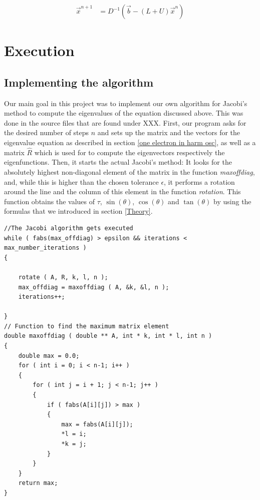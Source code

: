 \documentclass[10pt,a4paper]{article}
\begin{document}
\begin{align}
	\vec{x}^{n+1} &= D^{-1} \left( \vec{b}- (L+U) \vec{x}^{n} \right) 
\end{align}
\section{Execution}
\subsection{Implementing the algorithm}
Our main goal in this project was to implement our own algorithm for Jacobi's method to compute the eigenvalues of the equation discussed above. This was done in the source files that are found under XXX. First, our program asks for the desired number of steps $n$ and sets up the matrix and the vectors for the eigenvalue equation as described in section \ref{one electron in harm osc}, as well as a matrix $\hat{R}$ which is used for to compute the eigenvectors respectively the eigenfunctions. Then, it starts the actual Jacobi's method: It looks for the absolutely highest non-diagonal element of the matrix in the function \emph{maxoffdiag}, and, while this is higher than the chosen tolerance $\epsilon$, it performs a rotation around the line and the column of this element in the function \emph{rotation}. This function obtains the values of $\tau$, $\sin{(\theta)}$, $\cos{(\theta)}$ and $\tan{(\theta)}$ by using the formulas that we introduced in section \ref{Theory}.
\begin{lstlisting}
//The Jacobi algorithm gets executed
while ( fabs(max_offdiag) > epsilon && iterations < max_number_iterations )
{
	
	rotate ( A, R, k, l, n );
	max_offdiag = maxoffdiag ( A, &k, &l, n );
	iterations++;
	
}
// Function to find the maximum matrix element
double maxoffdiag ( double ** A, int * k, int * l, int n )
{
	double max = 0.0;
	for ( int i = 0; i < n-1; i++ )
	{
		for ( int j = i + 1; j < n-1; j++ )
		{
			if ( fabs(A[i][j]) > max )
			{
				max = fabs(A[i][j]);
				*l = i;
				*k = j;
			}
		}
	}
	return max;
}
\end{lstlisting}
\newpage
\end{document}
